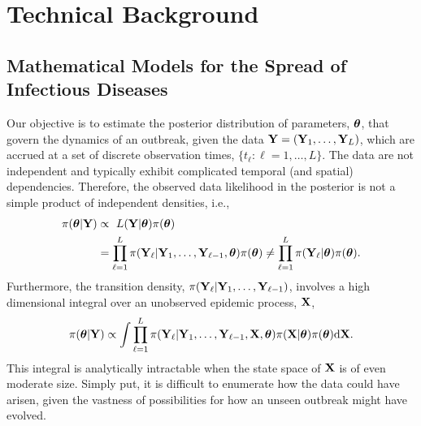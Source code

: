 \chapter{Technical Background}
\label{chap:background}

\section{Mathematical Models for the Spread of Infectious Diseases}
\label{sec:sem_background}

Our objective is to estimate the posterior distribution of parameters, $ \boldsymbol{\theta} $, that govern the dynamics of an outbreak, given the data $ \mathbf{Y} = (\mathbf{Y}_1,\dots,\mathbf{Y}_L) $, which are accrued at a set of discrete observation times, $ \lbrace t_\ell: \ell=1,\dots,L\rbrace $. The data are not independent and typically exhibit complicated temporal (and spatial) dependencies. Therefore, the observed data likelihood in the posterior is not a simple product of independent densities, i.e.,
\begin{align*}
\pi(\boldsymbol{\theta}|\mathbf{Y}) &\propto\ L(\mathbf{Y}|\boldsymbol{\theta})\pi(\boldsymbol{\theta}) \\
&= \prod_{\ell = 1}^{L} \pi(\mathbf{Y}_\ell|\mathbf{Y}_{1},\dots,\mathbf{Y}_{\ell-1},\boldsymbol{\theta})\pi(\boldsymbol{\theta}) \neq \prod_{\ell = 1}^{L} \pi(\mathbf{Y}_\ell|\boldsymbol{\theta})\pi(\boldsymbol{\theta}).
\end{align*}
Furthermore, the transition density, $ \pi(\mathbf{Y}_{\ell}|\mathbf{Y}_{1},\dots,\mathbf{Y}_{\ell-1}) $, involves a high dimensional integral over an unobserved epidemic process, $ \mathbf{X} $, 
\begin{equation}
\label{eqn:sem_post}
\pi(\boldsymbol{\theta}|\mathbf{Y}) \propto \int \prod_{\ell = 1}^{L} \pi(\mathbf{Y}_\ell|\mathbf{Y}_{1},\dots,\mathbf{Y}_{\ell-1},\mathbf{X},\boldsymbol{\theta})\pi(\mathbf{X}|\boldsymbol{\theta})\pi(\boldsymbol{\theta})\mathrm{d}\mathbf{X}.
\end{equation}
This integral is analytically intractable when the state space of $ \mathbf{X} $ is of even moderate size. Simply put, it is difficult to enumerate how the data could have arisen, given the vastness of possibilities for how an unseen outbreak might have evolved. 


